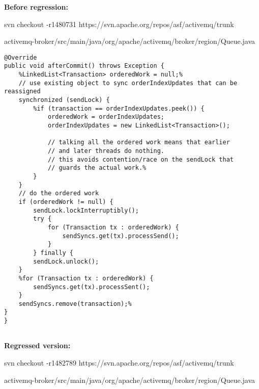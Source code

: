 \documentclass{article}
\begin{document}
\textbf{Before regression:}

svn checkout -r1480731 https://svn.apache.org/repos/asf/activemq/trunk

activemq-broker/src/main/java/org/apache/activemq/broker/region/Queue.java
\begin{lstlisting}[frame=single]
@Override
public void afterCommit() throws Exception {
	%LinkedList<Transaction> orderedWork = null;%
	// use existing object to sync orderIndexUpdates that can be reassigned
	synchronized (sendLock) {
		%if (transaction == orderIndexUpdates.peek()) {
			orderedWork = orderIndexUpdates;
			orderIndexUpdates = new LinkedList<Transaction>();
			
			// talking all the ordered work means that earlier
			// and later threads do nothing.
			// this avoids contention/race on the sendLock that
			// guards the actual work.%
		}
	}
	// do the ordered work
	if (orderedWork != null) {
		sendLock.lockInterruptibly();
		try {
			for (Transaction tx : orderedWork) {
				sendSyncs.get(tx).processSend();
			}
		} finally {
		sendLock.unlock();
	}
	%for (Transaction tx : orderedWork) {
		sendSyncs.get(tx).processSent();
	}
	sendSyncs.remove(transaction);%
}
}


\end{lstlisting}
\clearpage


\textbf{Regressed version:}

svn checkout -r1482789 https://svn.apache.org/repos/asf/activemq/trunk

activemq-broker/src/main/java/org/apache/activemq/broker/region/Queue.java
\end{document}
